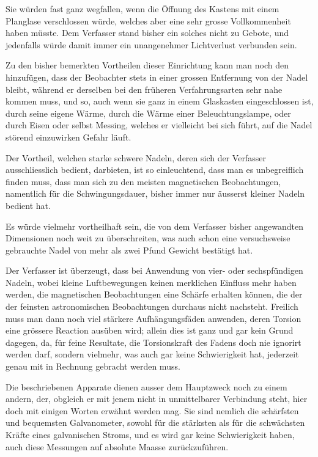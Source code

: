 \documentclass[12pt,a4paper]{article}
\begin{document}
Sie würden fast ganz wegfallen, wenn die Öffnung des Kastens mit einem Planglase verschlossen würde, welches aber eine sehr grosse Vollkommenheit haben müsste. Dem Verfasser stand bisher ein solches nicht zu Gebote, und jedenfalls würde damit immer ein unangenehmer Lichtverlust verbunden sein.

Zu den bisher bemerkten Vortheilen dieser Einrichtung kann man noch den hinzufügen, dass der Beobachter stets in einer grossen Entfernung von der Nadel bleibt, während er derselben bei den früheren Verfahrungsarten sehr nahe kommen muss, und so, auch wenn sie ganz in einem Glaskasten eingeschlossen ist, durch seine eigene Wärme, durch die Wärme einer Beleuchtungslampe, oder durch Eisen oder selbst Messing, welches er vielleicht bei sich führt, auf die Nadel störend einzuwirken Gefahr läuft.

Der Vortheil, welchen starke schwere Nadeln, deren sich der Verfasser ausschliesslich bedient, darbieten, ist so einleuchtend, dass man es unbegreiflich finden muss, dass man sich zu den meisten magnetischen Beobachtungen, namentlich für die Schwingungsdauer, bisher immer nur äusserst kleiner Nadeln bedient hat.

Es würde vielmehr vortheilhaft sein, die von dem Verfasser bisher angewandten Dimensionen noch weit zu überschreiten, was auch schon eine versuchsweise gebrauchte Nadel von mehr als zwei Pfund Gewicht bestätigt hat.

Der Verfasser ist überzeugt, dass bei Anwendung von vier- oder sechspfündigen Nadeln, wobei kleine Luftbewegungen keinen merklichen Einfluss mehr haben werden, die magnetischen Beobachtungen eine Schärfe erhalten können, die der der feinsten astronomischen Beobachtungen durchaus nicht nachsteht. Freilich muss man dann noch viel stärkere Aufhängungsfäden anwenden, deren Torsion eine grössere Reaction ausüben wird; allein dies ist ganz und gar kein Grund dagegen, da, für feine Resultate, die Torsionskraft des Fadens doch nie ignorirt werden darf, sondern vielmehr, was auch gar keine Schwierigkeit hat, jederzeit genau mit in Rechnung gebracht werden muss.

Die beschriebenen Apparate dienen ausser dem Hauptzweck noch zu einem andern, der, obgleich er mit jenem nicht in unmittelbarer Verbindung steht, hier doch mit einigen Worten erwähnt werden mag. Sie sind nemlich die schärfsten und bequemsten Galvanometer, sowohl für die stärksten als für die schwächsten Kräfte eines galvanischen Stroms, und es wird gar keine Schwierigkeit haben, auch diese Messungen auf absolute Maasse zurückzuführen.
\end{document}
